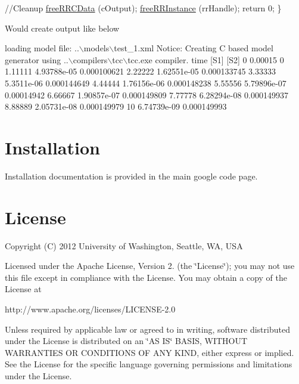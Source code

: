 \begin{DoxyCode}
    \textcolor{comment}{//Cleanup}
    \hyperlink{group__free_routines_gaca3178e98973909708974aedef4ece46}{freeRRCData} (cOutput);
    \hyperlink{group__initialization_gae0b2f65464742bba3beb0ad38dcdd863}{freeRRInstance} (rrHandle);
    \textcolor{keywordflow}{return} 0;
\}
\end{DoxyCode}


Would create output like below


\begin{DoxyCode}
loading model file: ..\(\backslash\)models\(\backslash\)test\_1.xml
Notice: Creating C based model generator \textcolor{keyword}{using} ..\(\backslash\)compilers\(\backslash\)tcc\(\backslash\)tcc.exe compiler.
time                    [S1]                    [S2]
0                       0.00015                 0
1.11111                 4.93788e-05             0.000100621
2.22222                 1.62551e-05             0.000133745
3.33333                 5.3511e-06              0.000144649
4.44444                 1.76156e-06             0.000148238
5.55556                 5.79896e-07             0.00014942
6.66667                 1.90857e-07             0.000149809
7.77778                 6.28294e-08             0.000149937
8.88889                 2.05731e-08             0.000149979
10                      6.74739e-09             0.000149993
\end{DoxyCode}
 \hypertarget{index_install_sec}{}\section{Installation}\label{index_install_sec}
Installation documentation is provided in the main google code page.\hypertarget{index_license_sec}{}\section{License}\label{index_license_sec}
Copyright (C) 2012 University of Washington, Seattle, W\-A, U\-S\-A

Licensed under the Apache License, Version 2. (the \char`\"{}\-License\char`\"{}); you may not use this file except in compliance with the License. You may obtain a copy of the License at \begin{DoxyVerb}http://www.apache.org/licenses/LICENSE-2.0
\end{DoxyVerb}


Unless required by applicable law or agreed to in writing, software distributed under the License is distributed on an \char`\"{}\-A\-S I\-S\char`\"{} B\-A\-S\-I\-S, W\-I\-T\-H\-O\-U\-T W\-A\-R\-R\-A\-N\-T\-I\-E\-S O\-R C\-O\-N\-D\-I\-T\-I\-O\-N\-S O\-F A\-N\-Y K\-I\-N\-D, either express or implied. See the License for the specific language governing permissions and limitations under the License.

